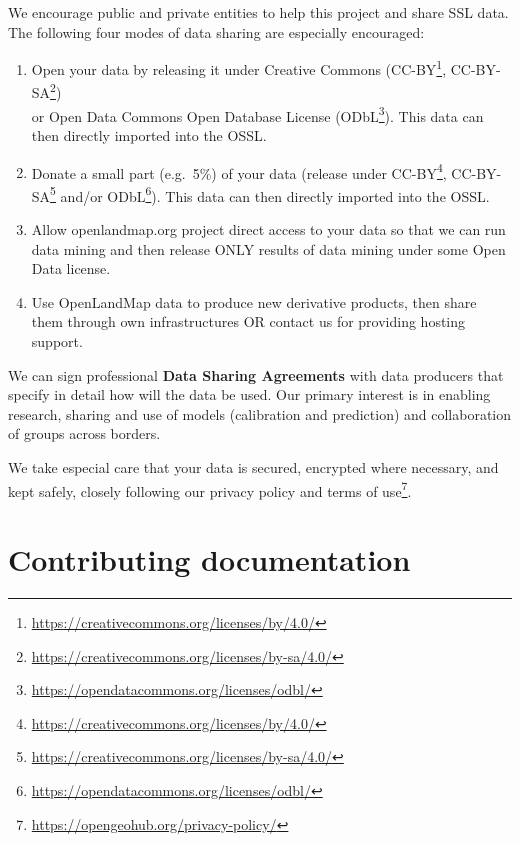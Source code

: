 \documentclass[
  graybox,natbib,nospthms]{svmono}
\providecommand{\tightlist}{%
  \setlength{\itemsep}{0pt}\setlength{\parskip}{0pt}}
\providecommand{\tightlist}{\setlength{\itemsep}{0pt}\setlength{\parskip}{0pt}}
\renewcommand{\href}[2]{#2 (\url{#1})}
\renewcommand{\href}[2]{#2\footnote{\url{#1}}}
\begin{document}
We encourage public and private entities to help this project and share SSL data.
The following four modes of data sharing are especially encouraged:

\begin{enumerate}
\def\labelenumi{\arabic{enumi}.}
\tightlist
\item
  Open your data by releasing it under Creative Commons (\href{https://creativecommons.org/licenses/by/4.0/}{CC-BY}, \href{https://creativecommons.org/licenses/by-sa/4.0/}{CC-BY-SA})\\
  or Open Data Commons Open Database License (\href{https://opendatacommons.org/licenses/odbl/}{ODbL}).
  This data can then directly imported into the OSSL.\\
\item
  Donate a small part (e.g.~5\%) of your data (release under \href{https://creativecommons.org/licenses/by/4.0/}{CC-BY}, \href{https://creativecommons.org/licenses/by-sa/4.0/}{CC-BY-SA} and/or \href{https://opendatacommons.org/licenses/odbl/}{ODbL}).
  This data can then directly imported into the OSSL.\\
\item
  Allow openlandmap.org project direct access to your data so that we can run data mining
  and then release ONLY results of data mining under some Open Data license.\\
\item
  Use OpenLandMap data to produce new derivative products, then share them through own
  infrastructures OR contact us for providing hosting support.
\end{enumerate}

We can sign professional \textbf{Data Sharing Agreements} with data producers
that specify in detail how will the data be used. Our primary interest is in enabling research,
sharing and use of models (calibration and prediction) and collaboration of groups
across borders.

We take especial care that your data is secured, encrypted where necessary,
and kept safely, closely following our \href{https://opengeohub.org/privacy-policy/}{privacy policy and terms of use}.

\hypertarget{contributing-documentation}{%
\section*{Contributing documentation}\label{contributing-documentation}}
\end{document}
